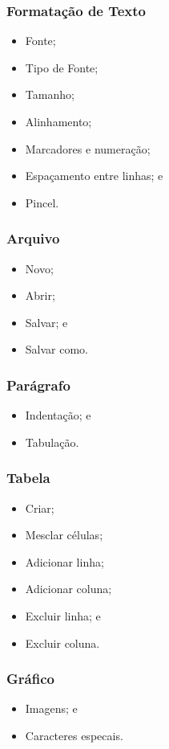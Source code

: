 \documentclass[aspectratio=169]{beamer} %
\begin{document}
\begin{frame}
	\frametitle{Formata\c cão de Texto}
			
	\begin{itemize}
		\item Fonte;
		\item Tipo de Fonte; 
		\item Tamanho; 
		\item Alinhamento;
		\item Marcadores e numera\c cão;
		\item Espa\c camento entre linhas; e
		\item Pincel.
	\end{itemize}
\end{frame}

\begin{frame}
	\frametitle{Arquivo}
			
	\begin{itemize}
		\item Novo;
		\item Abrir;
		\item Salvar; e
		\item Salvar como.
	\end{itemize}
\end{frame}

\begin{frame}
	\frametitle{Parágrafo}
			
	\begin{itemize}
		\item Indentação; e
		\item Tabulação.
	\end{itemize}
\end{frame}

\begin{frame}
	\frametitle{Tabela}
			
	\begin{itemize}
		\item Criar;
		\item Mesclar células; 
		\item Adicionar linha; 
		\item Adicionar coluna; 
		\item Excluir linha; e 
		\item Excluir coluna.
	\end{itemize}
\end{frame}

\begin{frame}
	\frametitle{Gráfico}
			
	\begin{itemize}
		\item Imagens; e
		\item Caracteres especais.
	\end{itemize}
\end{frame}
\end{document}
